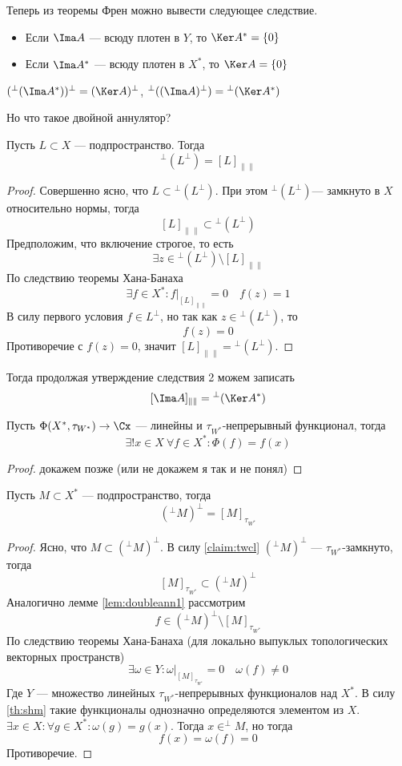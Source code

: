 Теперь из теоремы Френ можно вывести следующее следствие.
\begin{next1}\label{n:fr1}
	\hfill
	\begin{itemize}
		\item Если $\Ima A$ --- всюду плотен в $Y$, то $ \Ker A^* = \{0\}$
\item 	Если $\Ima A^*$ --- всюду плотен в $X^*$, то $\Ker A = \{0\}$
	\end{itemize}
\end{next1}
\begin{next2}
	$({}^\perp(\Ima A^*))^\perp = (\Ker A)^\perp$, ${}^\perp((\Ima A)^\perp) = {}^\perp(\Ker A^*)$
\end{next2}
Но что такое двойной аннулятор?
\begin{lemma}\label{lem:doubleann1}
	Пусть $L \subset X$ --- подпространство. Тогда
	$$
	{}^\perp(L^\perp) = [L]_{\|\|}
	$$
\end{lemma}
\begin{proof}
	Совершенно ясно, что $L \subset {}^\perp(L^\perp)$. При этом ${}^\perp(L^\perp)$--- замкнуто в $X$ относительно нормы, тогда 
	$$
	[L]_{\|\|} \subset  {}^\perp(L^\perp)
	$$
	Предположим, что включение строгое, то есть 
	$$
	\exists z \in  {}^\perp(L^\perp) \setminus [L]_{\|\|}
	$$
	По следствию теоремы Хана-Банаха 
	$$
	\exists f \in X^* \colon f\big|_{[L]_{\|\|}} = 0 \quad f(z) = 1
	$$
	В силу первого условия $f \in L^\perp$, но  так как $z \in  {}^\perp(L^\perp)$, то 
	$$
	f(z) = 0
	$$
	Противоречие с $f(z) = 0$, значит $[L]_{\|\|} =  {}^\perp(L^\perp)$.
\end{proof}
Тогда продолжая утверждение следствия 2 можем записать 
$$
[\Ima A]_{\|\|} = {}^\perp (\Ker A^*)
$$
\begin{theorem}[Шмульян]\label{th:shm}
	Пусть $\Phi (X^*, \tau_{W^*}) \to \Cx$ --- линейны и $\tau_{W^*}$-непрерывный функционал, тогда 
	$$
	\exists ! x \in X \ \forall f \in X^* \colon\Phi(f) = f(x)
	$$
\end{theorem}
\begin{proof}
	докажем позже (или не докажем я так и не понял)
\end{proof}
\begin{lemma}
	Пусть $M \subset X^*$ --- подпространство, тогда 
	$$
	({}^\perp M)^\perp = [M]_{\tau_{W^*}}
	$$
\end{lemma}
\begin{proof}
	Ясно, что $M \subset ({}^\perp M)^\perp$. В силу \ref{claim:twcl} $({}^\perp M)^\perp$ --- $\tau_{W^*}$-замкнуто, тогда 
	$$
	[M]_{\tau_{W^*}} \subset ({}^\perp M)^\perp
	$$
	Аналогично лемме \ref{lem:doubleann1} рассмотрим
	$$
	f \in ({}^\perp M)^\perp \setminus [M]_{\tau_{W^*}}
	$$
	По следствию теоремы Хана-Банаха (для локально выпуклых топологических векторных пространств)
	$$
	\exists \omega \in Y\colon \omega\big|_{[M]_{\tau_{W^*}}} = 0 \quad \omega(f) \neq 0 
	$$
	Где $Y$ --- множество линейных $\tau_{W^*}$-непрерывных функционалов над $X^*$. В силу \ref{th:shm} такие функционалы однозначно определяются элементом из $X$. $\exists x \in X\colon \forall g \in X^*\colon \omega(g) = g(x)$. Тогда $x \in ^\perp M$, но тогда 
	$$
	f(x) = \omega(f) = 0
	$$
	Противоречие.
\end{proof}
